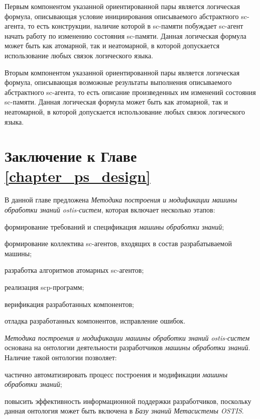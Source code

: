 \begin{SCn}
\begin{scnindent}
{    Первым компонентом указанной ориентированной пары является логическая формула, описывающая условие инициирования описываемого абстрактного sc-агента, то есть конструкции, наличие которой в sc-памяти побуждает sc-агент начать работу по изменению состояния sc-памяти. Данная логическая формула может быть как атомарной, так и неатомарной, в которой допускается использование любых связок логического языка.
    
    Вторым компонентом указанной ориентированной пары является логическая формула, описывающая возможные результаты выполнения описываемого абстрактного sc-агента, то есть описание произведенных им изменений состояния sc-памяти. Данная логическая формула может быть как атомарной, так и неатомарной, в которой допускается использование любых связок логического языка.}
\end{scnindent}
\end{SCn}

\section*{Заключение к Главе \ref{chapter_ps_design}}

В данной главе предложена \textit{Методика построения и модификации машины обработки знаний ostis-систем}, которая включает несколько этапов:
\begin{textitemize}
    \item формирование требований и спецификация \textit{машины обработки знаний};
    \item формирование коллектива sc-агентов, входящих в состав разрабатываемой машины;
    \item разработка алгоритмов атомарных sc-агентов;
    \item реализация scp-программ;
    \item верификация разработанных компонентов;
    \item отладка разработанных компонентов, исправление ошибок.
\end{textitemize}

\textit{Методика построения и модификации машины обработки знаний ostis-систем} основана на онтологии деятельности разработчиков \textit{машины обработки знаний}. Наличие такой онтологии позволяет:
\begin{textitemize}
    \item частично автоматизировать процесс построения и модификации \textit{машины обработки знаний};
    \item повысить эффективность информационной поддержки разработчиков, поскольку данная онтология может быть включена в \textit{Базу знаний Метасистемы OSTIS}.
\end{textitemize}

